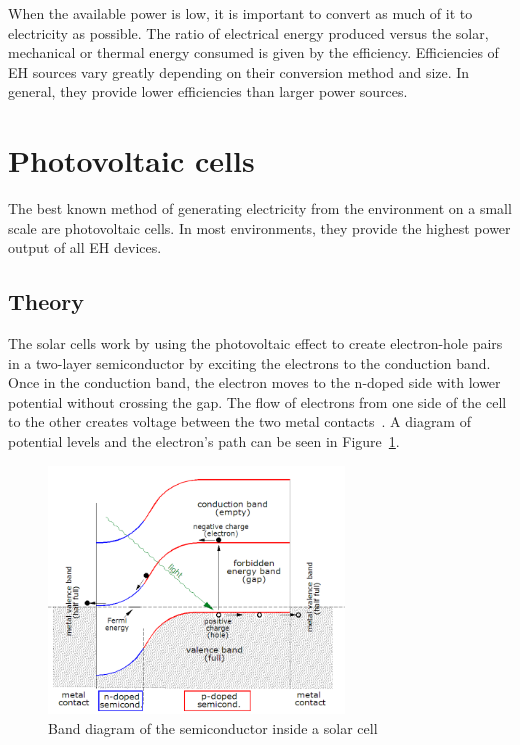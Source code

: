 \documentclass[a4paper,10pt]{article}
\begin{document}
When the available power is low, it is important to convert as much of it to electricity as possible. The ratio of electrical energy produced versus the solar, mechanical or thermal energy consumed is given by the efficiency. Efficiencies of \ac{EH} sources vary greatly depending on their conversion method and size. In general, they provide lower efficiencies than larger power sources. 

\section{Photovoltaic cells}

The best known method of generating electricity from the environment on a small scale are photovoltaic cells. In most environments, they provide the highest power output of all \ac{EH} devices. 

\subsection{Theory}

The solar cells work by using the photovoltaic effect to create electron-hole pairs in a two-layer semiconductor by exciting the electrons to the conduction band. Once in the conduction band, the electron moves to the n-doped side with lower potential without crossing the gap. The flow of electrons from one side of the cell to the other creates voltage between the two metal contacts~\cite{wiki:solar-cells}. A diagram of potential levels and the electron's path can be seen in Figure~\ref{fig:pv-band-diagram}. 

\begin{figure}[!h]
\centering
\includegraphics[width=0.7\textwidth]{./Slike/PV-band-diagram}
 \caption{Band diagram of the semiconductor inside a solar cell~\cite{wiki:solar-cells}}
\label{fig:pv-band-diagram}
\end{figure}
\end{document}

